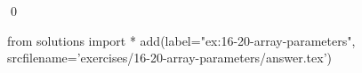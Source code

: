 
\begin{ex}
  \label{ex:16-20-array-parameters}
  
  \qed
\end{ex}
\begin{python0}
from solutions import *
add(label="ex:16-20-array-parameters",
    srcfilename='exercises/16-20-array-parameters/answer.tex')
\end{python0}
